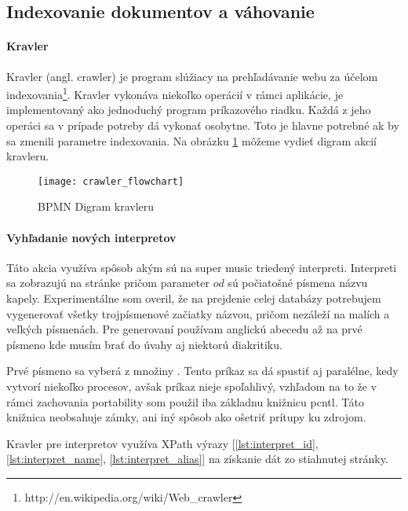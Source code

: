 \subsection{Indexovanie dokumentov a váhovanie}

\paragraph{Kravler}

Kravler (angl. crawler) je program slúžiacy na prehľadávanie webu za účelom
indexovania\footnote{http://en.wikipedia.org/wiki/Web\_crawler}. Kravler vykonáva niekoľko
operácií v rámci aplikácie, je implementovaný ako jednoduchý program príkazového riadku.
Každá z jeho operáci sa v prípade potreby dá vykonať osobytne. Toto je hlavne potrebné ak by
sa zmenili parametre indexovania. Na obrázku \ref{fig:crawler_flowchart} môžeme vydieť digram
akcií kravleru.

\begin{figure}
    \begin{center}
        \texttt{[image: crawler\_flowchart]}
        \caption{BPMN Digram kravleru}
        \label{fig:crawler_flowchart}
    \end{center}
\end{figure}

\paragraph{Vyhľadanie nových interpretov}

Táto akcia využíva spôsob akým sú na super music triedený interpreti.
Interpreti sa zobrazujú na stránke 
pričom parameter \(od\) sú počiatošné písmena názvu kapely. Experimentálne 
som overil, že na prejdenie celej databázy potrebujem vygenerovať všetky trojpísmenové
začiatky názvou, pričom nezáleží na malích a veľkých písmenách. Pre generovaní používam 
anglickú abecedu až na prvé písmeno kde musím brať do úvahy aj niektorú diakritiku.

Prvé písmeno sa vyberá z množiny 
.
Tento príkaz sa dá spustiť aj paralélne, kedy vytvorí niekoľko 
 procesov, avšak príkaz nieje spoľahlivý, vzhľadom na to že v rámci zachovania portability 
som použil iba základnu knižnicu pcntl. Táto knižnica neobsahuje zámky, ani iný spôsob ako 
ošetriť prítupy ku zdrojom.

Kravler pre interpretov využíva XPath výrazy
[\ref{lst:interpret_id}, \ref{lst:interpret_name}, \ref{lst:interpret_alias}] na získanie 
dát zo stiahnutej stránky.

